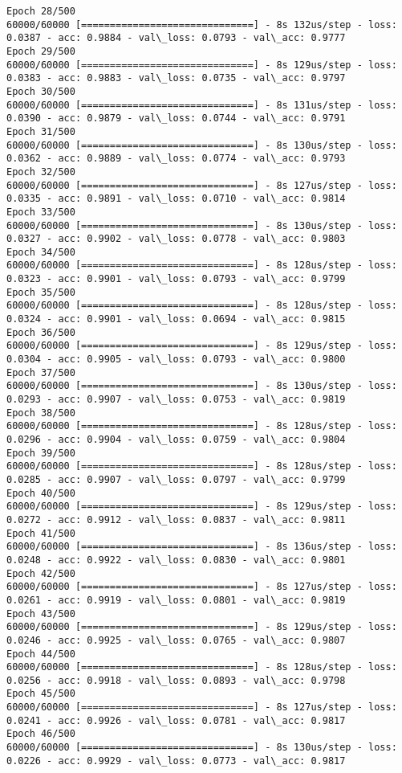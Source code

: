 \documentclass[11pt]{article}
\begin{document}
\begin{Verbatim}[commandchars=\\\{\}]
Epoch 28/500
60000/60000 [==============================] - 8s 132us/step - loss: 0.0387 - acc: 0.9884 - val\_loss: 0.0793 - val\_acc: 0.9777
Epoch 29/500
60000/60000 [==============================] - 8s 129us/step - loss: 0.0383 - acc: 0.9883 - val\_loss: 0.0735 - val\_acc: 0.9797
Epoch 30/500
60000/60000 [==============================] - 8s 131us/step - loss: 0.0390 - acc: 0.9879 - val\_loss: 0.0744 - val\_acc: 0.9791
Epoch 31/500
60000/60000 [==============================] - 8s 130us/step - loss: 0.0362 - acc: 0.9889 - val\_loss: 0.0774 - val\_acc: 0.9793
Epoch 32/500
60000/60000 [==============================] - 8s 127us/step - loss: 0.0335 - acc: 0.9891 - val\_loss: 0.0710 - val\_acc: 0.9814
Epoch 33/500
60000/60000 [==============================] - 8s 130us/step - loss: 0.0327 - acc: 0.9902 - val\_loss: 0.0778 - val\_acc: 0.9803
Epoch 34/500
60000/60000 [==============================] - 8s 128us/step - loss: 0.0323 - acc: 0.9901 - val\_loss: 0.0793 - val\_acc: 0.9799
Epoch 35/500
60000/60000 [==============================] - 8s 128us/step - loss: 0.0324 - acc: 0.9901 - val\_loss: 0.0694 - val\_acc: 0.9815
Epoch 36/500
60000/60000 [==============================] - 8s 129us/step - loss: 0.0304 - acc: 0.9905 - val\_loss: 0.0793 - val\_acc: 0.9800
Epoch 37/500
60000/60000 [==============================] - 8s 130us/step - loss: 0.0293 - acc: 0.9907 - val\_loss: 0.0753 - val\_acc: 0.9819
Epoch 38/500
60000/60000 [==============================] - 8s 128us/step - loss: 0.0296 - acc: 0.9904 - val\_loss: 0.0759 - val\_acc: 0.9804
Epoch 39/500
60000/60000 [==============================] - 8s 128us/step - loss: 0.0285 - acc: 0.9907 - val\_loss: 0.0797 - val\_acc: 0.9799
Epoch 40/500
60000/60000 [==============================] - 8s 129us/step - loss: 0.0272 - acc: 0.9912 - val\_loss: 0.0837 - val\_acc: 0.9811
Epoch 41/500
60000/60000 [==============================] - 8s 136us/step - loss: 0.0248 - acc: 0.9922 - val\_loss: 0.0830 - val\_acc: 0.9801
Epoch 42/500
60000/60000 [==============================] - 8s 127us/step - loss: 0.0261 - acc: 0.9919 - val\_loss: 0.0801 - val\_acc: 0.9819
Epoch 43/500
60000/60000 [==============================] - 8s 129us/step - loss: 0.0246 - acc: 0.9925 - val\_loss: 0.0765 - val\_acc: 0.9807
Epoch 44/500
60000/60000 [==============================] - 8s 128us/step - loss: 0.0256 - acc: 0.9918 - val\_loss: 0.0893 - val\_acc: 0.9798
Epoch 45/500
60000/60000 [==============================] - 8s 127us/step - loss: 0.0241 - acc: 0.9926 - val\_loss: 0.0781 - val\_acc: 0.9817
Epoch 46/500
60000/60000 [==============================] - 8s 130us/step - loss: 0.0226 - acc: 0.9929 - val\_loss: 0.0773 - val\_acc: 0.9817

\end{Verbatim}
\end{document}
